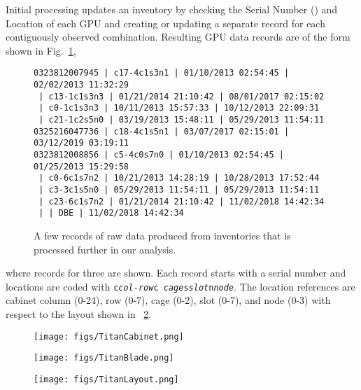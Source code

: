 Initial processing updates an inventory by checking the Serial Number
() and Location of each GPU and creating or updating a
separate record for each contiguously observed
 combination. Resulting GPU data records are
of the form shown in Fig.~\ref{fig:dataraw},
\begin{figure}[tb]
{\notsotiny
\begin{verbatim}
0323812007945 | c17-4c1s3n1 | 01/10/2013 02:54:45 | 02/02/2013 11:32:29
 | c13-1c1s3n3 | 01/21/2014 21:10:42 | 08/01/2017 02:15:02
 | c0-1c1s3n3 | 10/11/2013 15:57:33 | 10/12/2013 22:09:31
 | c21-1c2s5n0 | 03/19/2013 15:48:11 | 05/29/2013 11:54:11
0325216047736 | c18-4c1s5n1 | 03/07/2017 02:15:01 | 03/12/2019 03:19:11
0323812008856 | c5-4c0s7n0 | 01/10/2013 02:54:45 | 01/25/2013 15:29:58
 | c0-6c1s7n2 | 10/21/2013 14:28:19 | 10/28/2013 17:52:44
 | c3-3c1s5n0 | 05/29/2013 11:54:11 | 05/29/2013 11:54:11
 | c23-6c1s7n2 | 01/21/2014 21:10:42 | 11/02/2018 14:42:34
 | | DBE | 11/02/2018 14:42:34
\end{verbatim}
}
\caption{A few records of raw data produced from inventories  that is processed further in our analysis.}
\label{fig:dataraw}
\end{figure}
where records for three are shown. Each record starts with a serial
number and locations are coded with {\tt c{\it col-row}c{\it
    cage}s{\it slot}n{\it node}}. The location references are cabinet
column (0-24), row (0-7), cage (0-2), slot (0-7), and node (0-3) with
respect to the layout shown in ~\ref{fig:layout}. 
\begin{figure}
  \centering
  \texttt{[image: figs/TitanCabinet.png]}
  \begin{minipage}{0.35\columnwidth}
    \texttt{[image: figs/TitanBlade.png]}
  \end{minipage}
  \hfil
  \begin{minipage}{0.49\columnwidth}
    \texttt{[image: figs/TitanLayout.png]}
  \end{minipage}
  \caption{}
  \label{fig:layout}
\end{figure}

